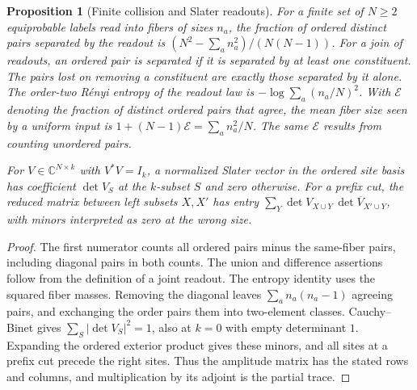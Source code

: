 \documentclass[11pt,reqno]{amsart}
\newtheorem{proposition}[theorem]{Proposition}
\theoremstyle{definition}
\theoremstyle{remark}
\numberwithin{equation}{section}
\newcommand{\C}{\mathbb{C}}
\begin{document}
\begin{proposition}[Finite collision and Slater readouts]\label{m9:readouts}
For a finite set of \(N\ge2\) equiprobable labels read into
fibers of sizes \(n_a\), the fraction of ordered distinct
pairs separated by the readout is
\((N^2-\sum_a n_a^2)/(N(N-1))\).
For a join of readouts, an ordered pair is separated if it
is separated by at least one constituent. The pairs lost
on removing a constituent are exactly those separated by
it alone. The order-two R\'enyi entropy of the readout
law is \(-\log\sum_a(n_a/N)^2\). With \(\mathcal E\) denoting
the fraction of distinct ordered pairs that agree, the mean
fiber size seen by a uniform input is
\(1+(N-1)\mathcal E=\sum_a n_a^2/N\).
The same \(\mathcal E\) results from counting unordered pairs.

For \(V\in\C^{N\times k}\) with \(V^*V=I_k\), a normalized
Slater vector in the ordered site basis has coefficient
\(\det V_S\) at the \(k\)-subset \(S\) and zero otherwise.
For a prefix cut, the reduced matrix between left subsets
\(X,X'\) has entry
\(\sum_Y \det V_{X\cup Y}\,\overline{\det V_{X'\cup Y}}\),
with minors interpreted as zero at the wrong size.
\end{proposition}
\begin{proof}
The first numerator counts all ordered pairs minus the
same-fiber pairs, including diagonal pairs in both counts.
The union and difference assertions follow from the definition
of a joint readout. The entropy identity uses the squared
fiber masses. Removing the diagonal leaves
\(\sum_a n_a(n_a-1)\) agreeing pairs, and exchanging the order
pairs them into two-element classes. Cauchy--Binet gives \(\sum_S |\det V_S|^2=1\),
also at \(k=0\) with empty determinant \(1\).
Expanding the ordered exterior product gives these minors,
and all sites at a prefix cut precede the right sites.
Thus the amplitude matrix has the stated rows and columns,
and multiplication by its adjoint is the partial trace.
\end{proof}
\end{document}
